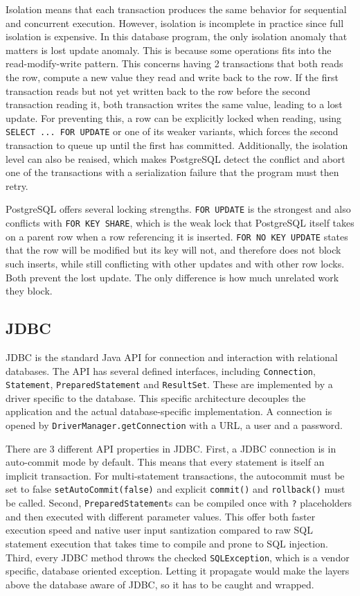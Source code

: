\documentclass[a4paper]{scrartcl}
\renewcommand{\_}{\textunderscore\allowbreak}
\begin{document}
Isolation means that each transaction produces the same behavior for sequential and concurrent execution. However, isolation is incomplete in practice since full isolation is expensive. In this database program, the only isolation anomaly that matters is lost update anomaly. This is because some operations fits into the read-modify-write pattern. This concerns having 2 transactions that both reads the row, compute a new value they read and write back to the row. If the first transaction reads but not yet written back to the row before the second transaction reading it, both transaction writes the same value, leading to a lost update. For preventing this, a row can be explicitly locked when reading, using \texttt{SELECT ... FOR UPDATE} or one of its weaker variants, which forces the second transaction to queue up until the first has committed. Additionally, the isolation level can also be reaised, which makes PostgreSQL detect the conflict and abort one of the transactions with a serialization failure that the program must then retry.

PostgreSQL offers several locking strengths. \texttt{FOR UPDATE} is the strongest and also conflicts with \texttt{FOR KEY SHARE}, which is the weak lock that PostgreSQL itself takes on a parent row when a row referencing it is inserted. \texttt{FOR NO KEY UPDATE} states that the row will be modified but its key will not, and therefore does not block such inserts, while still conflicting with other updates and with other row locks. Both prevent the lost update. The only difference is how much unrelated work they block.

\subsection{JDBC}

JDBC is the standard Java API for connection and interaction with relational databases. The API has several defined interfaces, including \texttt{Connection}, \texttt{Statement}, \texttt{PreparedStatement} and \texttt{ResultSet}. These are implemented by a driver specific to the database. This specific architecture decouples the application and the actual database-specific implementation. A connection is opened by \texttt{DriverManager.getConnection} with a URL, a user and a password.

There are 3 different API properties in JDBC. First, a JDBC connection is in auto-commit mode by default. This means that every statement is itself an implicit transaction. For multi-statement transactions, the autocommit must be set to false \texttt{setAutoCommit(false)} and explicit \texttt{commit()} and \texttt{rollback()} must be called. Second, \texttt{PreparedStatement}s can be compiled once with \texttt{?} placeholders and then executed with different parameter values. This offer both faster execution speed and native user input santization compared to raw SQL statement execution that takes time to compile and prone to SQL injection. Third, every JDBC method throws the checked \texttt{SQLException}, which is a vendor specific, database oriented exception. Letting it propagate would make the layers above the database aware of JDBC, so it has to be caught and wrapped.
\end{document}
